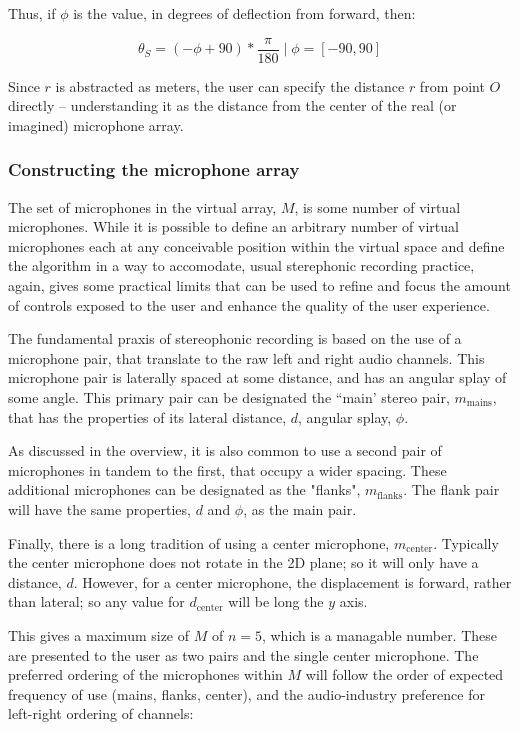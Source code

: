 Thus, if $\phi$ is the value, in degrees of deflection from forward, then:

\begin{equation}
\theta_S = (-\phi + 90) * \frac{\pi}{180} \; | \; \phi = [-90,90]
\end{equation}

Since $r$ is abstracted as meters, the user can specify the distance $r$ from point $O$ directly -- understanding it as the distance from the center of the real (or imagined) microphone array.

\subsubsection{Constructing the microphone array}

The set of microphones in the virtual array, $M$, is some number of virtual microphones. While it is possible to define an arbitrary number of virtual microphones each at any conceivable position within the virtual space and define the algorithm in a way to accomodate, usual sterephonic recording practice, again, gives some practical limits that can be used to refine and focus the amount of controls exposed to the user and enhance the quality of the user experience.

The fundamental praxis of stereophonic recording is based on the use of a microphone pair, that translate to the raw left and right audio channels. This microphone pair is laterally spaced at some distance, and has an angular splay of some angle. This primary pair can be designated the ``main' stereo pair, $m_\text{mains}$, that has the properties of its lateral distance, $d$, angular splay, $\phi$.

As discussed in the overview, it is also common to use a second pair of microphones in tandem to the first, that occupy a wider spacing. These additional microphones can be designated as the "flanks", $m_\text{flanks}$. The flank pair will have the same properties, $d$ and $\phi$, as the main pair.

Finally, there is a long tradition of using a center microphone, $m_\text{center}$. Typically the center microphone does not rotate in the 2D plane; so it will only have a distance, $d$. However, for a center microphone, the displacement is forward, rather than lateral; so any value for $d_\text{center}$ will be long the $y$ axis.

This gives a maximum size of $M$ of $n=5$, which is a managable number. These are presented to the user as two pairs and the single center microphone. The preferred ordering of the microphones within $M$ will follow the order of expected frequency of use (mains, flanks, center), and the audio-industry preference for left-right ordering of channels:

